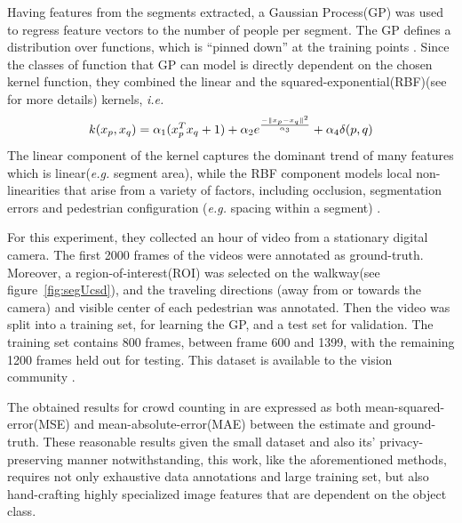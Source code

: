 Having features from the segments extracted, a Gaussian Process(GP) \cite{williams2006gaussian} was used to regress feature vectors to the number of people per segment. The GP defines a distribution over functions, which is “pinned down” at the training points \cite{chan2008privacy}. Since the classes of function that GP can model is directly dependent on the chosen kernel function, they combined the linear and the squared-exponential(RBF)(see \cite{chang2010training, vert2004primer, shashua2009introduction} for more details) kernels, \textit{i.e.}
\begin{equation}
\centering k(x_p, x_q) = \alpha_1(x_p^{T}x_q+1) + \alpha_2e^{\frac{-\|x_p-x_q\|^2}{\alpha_3}} + \alpha_4\delta(p,q)     
\end{equation}
The linear component of the kernel captures the dominant trend of many features which is linear(\textit{e.g.} segment area), while the RBF component models local non-linearities that arise from a variety of factors, including occlusion, segmentation errors and pedestrian configuration (\textit{e.g.} spacing within a segment) \cite{chan2008privacy}. 
  
For this experiment, they collected an hour of video from a stationary digital camera. The first 2000 frames of the videos were annotated as ground-truth. Moreover, a region-of-interest(ROI) was selected on the walkway(see figure~\ref{fig:segUcsd}), and the traveling directions (away from or towards the camera) and visible center of each pedestrian was annotated. Then the video was split into a training set, for learning the GP, and a test set for validation. The training set contains 800 frames, between frame 600 and 1399, with the remaining 1200 frames held out for testing. This dataset is available to the vision community \cite{chan2008privacy}.

The obtained results for crowd counting in  \cite{chan2008privacy} are expressed as both mean-squared-error(MSE) and mean-absolute-error(MAE) between the estimate and ground-truth. These reasonable results given the small dataset and also its' privacy-preserving manner notwithstanding, this work, like the aforementioned methods, requires not only exhaustive data annotations and large training set, but also hand-crafting highly specialized image features that are dependent on the object class. 


